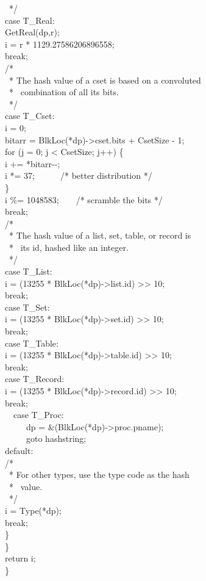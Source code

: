 {\>\>\>\ */\\
\>\>\>case T\_Real:\\
\>\>\>\>GetReal(dp,r);\\
\>\>\>\>i = r * 1129.27586206896558;\\
\>\>\>\>break;\\
\>\>\>/*\\
\>\>\>\ * The hash value of a cset is based on a convoluted \\
\>\>\>\ * \ combination of all its bits.\\
\>\>\>\ */\\
\>\>\>case T\_Cset:\\
\>\>\>\>i = 0;\\
\>\>\>\>bitarr = BlkLoc(*dp)->cset.bits + CsetSize - 1;\\
\>\>\>\>for (j = 0; j < CsetSize; j++) \{\\
\>\>\>\>\>i += *bitarr-{}-;\\
\>\>\>\>\>i *= 37;\ \ \ \ \ \ /* better distribution */\\
\>\>\>\>\>\}\\
\>\>\>\>i \%= 1048583;\ \ \ \ /* scramble the bits */\\
\>\>\>\>break;\\
\>\>\>/*\\
\>\>\>\ * The hash value of a list, set, table, or record is \\
\>\>\>\ * \ its id, hashed like an integer.\\
\>\>\>\ */\\
\>\>\>case T\_List:\\
\>\>\>\>i = (13255 * BlkLoc(*dp)->list.id) >> 10;\\
\>\>\>\>break;\\
\>\>\>case T\_Set:\\
\>\>\>\>i = (13255 * BlkLoc(*dp)->set.id) >> 10;\\
\>\>\>\>break;\\
\>\>\>case T\_Table:\\
\>\>\>\>i = (13255 * BlkLoc(*dp)->table.id) >> 10;\\
\>\>\>\>break;\\
\>\>\>case T\_Record:\\
\>\>\>\>i = (13255 * BlkLoc(*dp)->record.id) >> 10;\\
\>\>\>\>break;\\
\ \  case T\_Proc:\\
\ \  \ \ \ dp = \&(BlkLoc(*dp)->proc.pname);\\
\ \  \ \ \ goto hashstring;\\
\>\>\>default:\\
\>\>\>\>/*\\
\>\>\>\>\ * For other types, use the type code as the hash\\
\>\>\>\>\ * \ value.\\
\>\>\>\>\ */\\
\>\>\>\>i = Type(*dp);\\
\>\>\>\>break;\\
\>\>\>\}\\
\>\>\}\\
\>return i;\\
\>\}
}

